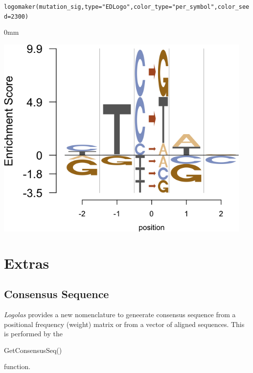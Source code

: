 \documentclass[12pt]{article}\usepackage[]{graphicx}\usepackage[usenames,dvipsnames]{color}
\newcommand{\hlnum}[1]{\textcolor[rgb]{0.816,0.125,0.439}{#1}}%
\newcommand{\hlstr}[1]{\textcolor[rgb]{0.251,0.627,0.251}{#1}}%
\newcommand{\hlstd}[1]{\textcolor[rgb]{0.251,0.251,0.251}{#1}}%
\newcommand{\hlkwc}[1]{\textcolor[rgb]{0.251,0.251,0.251}{#1}}%
\newcommand{\hlkwd}[1]{\textcolor[rgb]{0.878,0.439,0.125}{#1}}%
\newenvironment{knitrout}{}{} %
\newcommand{\Logolas}{\textit{Logolas}}
\begin{document}
\begin{knitrout}
\color{fgcolor}\begin{kframe}
\begin{alltt}
\hlkwd{logomaker}\hlstd{(mutation_sig,} \hlkwc{type} \hlstd{=} \hlstr{"EDLogo"}\hlstd{,} \hlkwc{color_type} \hlstd{=} \hlstr{"per_symbol"}\hlstd{,}  \hlkwc{color_seed} \hlstd{=} \hlnum{2300}\hlstd{)}
\end{alltt}
\end{kframe}\begin{adjustwidth}{\fltoffset}{0mm}

\includegraphics[width=5in,height=4in]{figure/mutsig4-1} \hfill{}

\end{adjustwidth}
\end{knitrout}


\section{Extras}

\subsection{Consensus Sequence}

\Logolas{} provides a new nomenclature to geneerate consensus sequence from a positional frequency (weight) matrix or from a vector of aligned sequences. This is performed by the \begin{verb} GetConsensusSeq() \end{verb} function.
\end{document}
